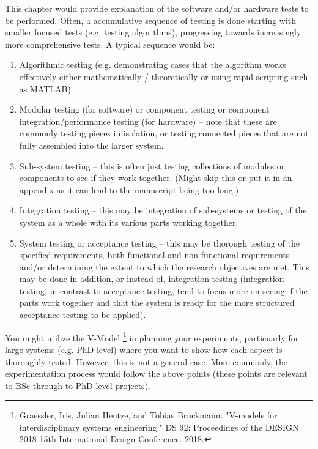 \label{Ch:Experimentation}

This chapter would provide explanation of the software and/or hardware tests to be performed. Often, a accumulative sequence of testing is done starting with smaller focused tests (e.g. testing algorithms), progressing towards increasingly more comprehensive tests. A typical sequence would be:

\begin{enumerate}
	\item Algorithmic testing (e.g. demonstrating cases that the algorithm works effectively either mathematically / theoretically or using rapid scripting such as MATLAB).
	\item Modular testing (for software) or component testing or component integration/performance testing (for hardware) -- note that these are commonly testing pieces in isolation, or testing  connected pieces that are not fully assembled into the larger system.
	\item Sub-system testing -- this is often just testing collections of modules or components to see if they work together. (Might skip this or put it in an appendix as it can lead to the manuscript being too long.)
	\item Integration testing -- this may be integration of sub-systems or testing of the system as a whole with its various parts working together.
	\item System testing or acceptance testing -- this may be thorough testing of the specified requirements, both functional and non-functional requirements and/or determining the extent to which the research objectives are met. This may be done in addition, or instead of, integration testing (integration testing, in contrast to acceptance testing, tend to focus more on seeing if the parts work together and that the system is ready for the more structured acceptance testing to be applied).
\end{enumerate}

You might utilize the V-Model  \footnote{Graessler, Iris, Julian Hentze, and Tobias Bruckmann. "V-models for interdisciplinary systems engineering." DS 92: Proceedings of the DESIGN 2018 15th International Design Conference. 2018.} in planning your experiments, particuarly for large systems (e.g. PhD level) where you want to show how each aspect is thoroughly tested. However, this is not a general case. More commonly, the experimentation process would follow the above points (these points are relevant to BSc through to PhD level projects).
